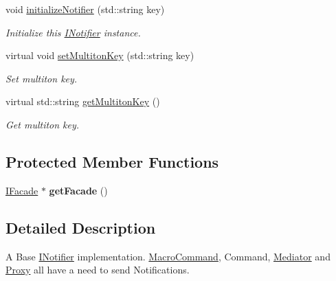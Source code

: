 \begin{DoxyCompactItemize}
\item 
void \hyperlink{class_pure_m_v_c_1_1_notifier_a6910365c70415ba7973401215f57e4af}{initializeNotifier} (std::string key)
\begin{DoxyCompactList}\small\item\em Initialize this \hyperlink{class_pure_m_v_c_1_1_i_notifier}{INotifier} instance. \item\end{DoxyCompactList}\item 
virtual void \hyperlink{class_pure_m_v_c_1_1_multiton_key_heir_abc70ef7c066bc8d7bf0196ec727599bb}{setMultitonKey} (std::string key)
\begin{DoxyCompactList}\small\item\em Set multiton key. \item\end{DoxyCompactList}\item 
virtual std::string \hyperlink{class_pure_m_v_c_1_1_multiton_key_heir_aa5622459d33380deb08dc3cab8b991c7}{getMultitonKey} ()
\begin{DoxyCompactList}\small\item\em Get multiton key. \item\end{DoxyCompactList}\end{DoxyCompactItemize}
\subsection*{Protected Member Functions}
\begin{DoxyCompactItemize}
\item 
\hypertarget{class_pure_m_v_c_1_1_notifier_a3eeda7190c0c0a2af8d34074df332bbe}{
\hyperlink{class_pure_m_v_c_1_1_i_facade}{IFacade} $\ast$ {\bfseries getFacade} ()}
\label{class_pure_m_v_c_1_1_notifier_a3eeda7190c0c0a2af8d34074df332bbe}

\end{DoxyCompactItemize}


\subsection{Detailed Description}
A Base {\ttfamily \hyperlink{class_pure_m_v_c_1_1_i_notifier}{INotifier}} implementation. {\ttfamily \hyperlink{class_pure_m_v_c_1_1_macro_command}{MacroCommand}, Command, \hyperlink{class_pure_m_v_c_1_1_mediator}{Mediator}} and {\ttfamily \hyperlink{class_pure_m_v_c_1_1_proxy}{Proxy}} all have a need to send {\ttfamily Notifications}. 

